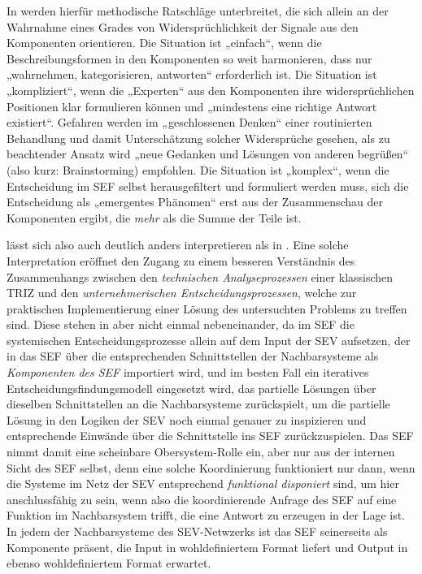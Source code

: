 \documentclass[12pt,a4paper]{article}
\begin{document}
In \cite{Snowden2007} werden hierfür methodische Ratschläge unterbreitet, die
sich allein an der Wahrnahme eines Grades von Widersprüchlichkeit der Signale
aus den Komponenten orientieren. Die Situation ist „einfach“, wenn die
Beschreibungsformen in den Komponenten so weit harmonieren, dass nur
„wahrnehmen, kategorisieren, antworten“ erforderlich ist. Die Situation ist
„kompliziert“, wenn die „Experten“ aus den Komponenten ihre widersprüchlichen
Positionen klar formulieren können und „mindestens eine richtige Antwort
existiert“.  Gefahren werden im „geschlossenen Denken“ einer routinierten
Behandlung und damit Unterschätzung solcher Widersprüche gesehen, als zu
beachtender Ansatz wird „neue Gedanken und Lösungen von anderen begrüßen“
(also kurz: Brainstorming) empfohlen.  Die Situation ist „komplex“, wenn die
Entscheidung im SEF selbst herausgefiltert und formuliert werden muss, sich
die Entscheidung als „emergentes Phänomen“ erst aus der Zusammenschau der
Komponenten ergibt, die \emph{mehr} als die Summe der Teile ist.

\cite{Snowden2007} lässt sich also auch deutlich anders interpretieren als in
\cite{Mann2019}. Eine solche Interpretation eröffnet den Zugang zu einem
besseren Verständnis des Zusammenhangs zwischen den \emph{technischen
  Analyseprozessen} einer klassischen TRIZ und den \emph{unternehmerischen
  Entscheidungsprozessen}, welche zur praktischen Implementierung einer Lösung
des untersuchten Problems zu treffen sind. Diese stehen in \cite{Snowden2007}
aber nicht einmal nebeneinander, da im SEF die systemischen
Entscheidungsprozesse allein auf dem Input der SEV aufsetzen, der in das SEF
über die entsprechenden Schnittstellen der Nachbarsysteme als
\emph{Komponenten des SEF} importiert wird, und im besten Fall ein iteratives
Entscheidungsfindungsmodell eingesetzt wird, das partielle Lösungen über
dieselben Schnittstellen an die Nachbarsysteme zurückspielt, um die partielle
Lösung in den Logiken der SEV noch einmal genauer zu inspizieren und
entsprechende Einwände über die Schnittstelle ins SEF zurückzuspielen.  Das
SEF nimmt damit eine scheinbare Obersystem-Rolle ein, aber nur aus der
internen Sicht des SEF selbst, denn eine solche Koordinierung funktioniert nur
dann, wenn die Systeme im Netz der SEV entsprechend \emph{funktional
  disponiert} sind, um hier anschlussfähig zu sein, wenn also die
koordinierende Anfrage des SEF auf eine Funktion im Nachbarsystem trifft, die
eine Antwort zu erzeugen in der Lage ist. In jedem der Nachbarsysteme des
SEV-Netwzerks ist das SEF seinerseits als Komponente präsent, die Input in
wohldefiniertem Format liefert und Output in ebenso wohldefiniertem Format
erwartet.
\end{document}
